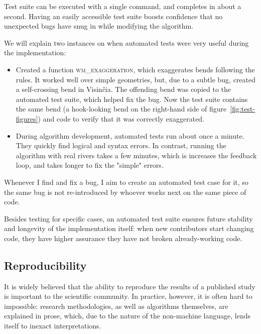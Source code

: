 \documentclass[a4paper]{article}
\begin{document}
Test suite can be executed with a single command, and completes in about a
second. Having an easily accessible test suite boosts confidence that no
unexpected bugs have snug in while modifying the algorithm.

We will explain two instances on when automated tests were very useful during
the implementation:
\begin{itemize}

    \item Created a function \textsc{wm\_exaggeration}, which exaggerates bends
        following the rules. It worked well over simple geometries, but, due to
        a subtle bug, created a self-crossing bend in Visinčia. The offending
        bend was copied to the automated test suite, which helped fix the bug.
        Now the test suite contains the same bend (a hook-looking bend on the
        right-hand side of figure~\ref{fig:test-figures}) and code to verify
        that it was correctly exaggerated.

    \item During algorithm development, automated tests run about once a
        minute. They quickly find logical and syntax errors. In contrast,
        running the algorithm with real rivers takes a few minutes, which is
        increases the feedback loop, and takes longer to fix the "simple"
        errors.

\end{itemize}

Whenever I find and fix a bug, I aim to create an automated test case for it,
so the same bug is not re-introduced by whoever works next on the same piece of
code.

Besides testing for specific cases, an automated test suite ensures future
stability and longevity of the implementation itself: when new contributors
start changing code, they have higher assurance they have not broken
already-working code.

\subsection{Reproducibility}
\label{sec:reproducing-the-paper}

It is widely believed that the ability to reproduce the results of a published
study is important to the scientific community. In practice, however, it is
often hard to impossible: research methodologies, as well as algorithms
themselves, are explained in prose, which, due to the nature of the non-machine
language, lends itself to inexact interpretations.
\end{document}
